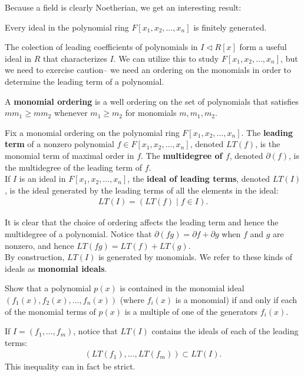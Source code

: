 \documentclass{memoir}
\begin{document}


Because a field is clearly Noetherian, we get an interesting result:
\begin{cor}
	Every ideal in the polynomial ring \(F[x_1,x_2,\ldots,x_n]\) is finitely generated.
\end{cor}
The colection of leading coefficients of polynomials in \(I\triangleleft R[x]\) form a useful ideal in \(R\) that characterizes \(I\). We can utilize this to study \(F[x_1,x_2,\ldots,x_n]\), but we need to exercise caution-- we need an ordering on the monomials in order to determine the leading term of a polynomial.

\begin{defn}
	A \textbf{monomial ordering} is a well ordering on the set of polynomials that satisfies \(mm_1\geq mm_2\) whenever \(m_1\geq m_2\) for monomials \(m,m_1,m_2\).
\end{defn}

\begin{defn}
	Fix a monomial ordering on the polynomial ring \(F[x_1,x_2,\ldots,x_n]\). The \textbf{leading term} of a nonzero polynomial \(f \in F[x_1,x_2,\ldots,x_n]\), denoted \(LT(f)\), is the monomial term of maximal order in \(f\). The \textbf{multidegree of \(f\)}, denoted \(\partial(f)\), is the multidegree of the leading term of \(f\).\\

	If \(I\) is an ideal in \(F[x_1,x_2,\ldots,x_n]\), the \textbf{ideal of leading terms}, denoted \(LT(I)\), is the ideal generated by the leading terms of all the elements in the ideal:
	\begin{align*}
		LT(I) = (LT(f) \mid f \in I).
	\end{align*}
\end{defn}
It is clear that the choice of ordering affects the leading term and hence the multidegree of a polynomial. Notice that \(\partial(fg) = \partial f + \partial g\) when \(f\) and \(g\) are nonzero, and hence \(LT(fg) = LT(f) + LT(g)\).\\

By construction, \(LT(I)\) is generated by monomials. We refer to these kinds of ideals as \textbf{monomial ideals}.

\begin{hw}
	Show that a polynomial \(p(x)\) is contained in the monomial ideal \((f_1(x),f_2(x),\ldots,f_n(x))\) (where \(f_i(x)\) is a monomial) if and only if each of the monomial terms of \(p(x)\) is a multiple of one of the generators \(f_i(x)\).
\end{hw}
If \(I = (f_1,\ldots,f_m)\), notice that \(LT(I)\) contains the ideals of each of the leading terms:
\begin{align*}
	(LT(f_1),\ldots,LT(f_m)) \subset LT(I).
\end{align*}
This inequality can in fact be strict.
\end{document}

